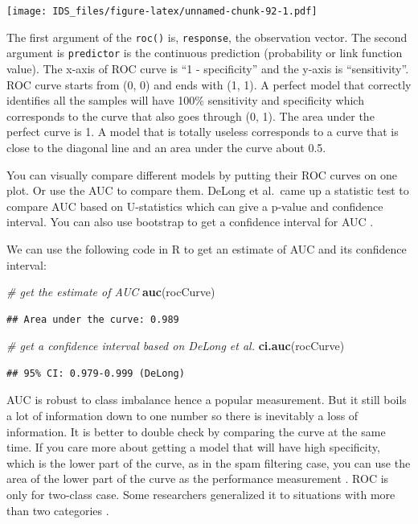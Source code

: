 \documentclass[12pt,]{krantz}
\makeatletter
\newenvironment{Shaded}{\begin{snugshade}}{\end{snugshade}}
\newcommand{\CommentTok}[1]{\textcolor[rgb]{0.37,0.37,0.37}{\textit{#1}}}
\newcommand{\KeywordTok}[1]{\textcolor[rgb]{0.27,0.27,0.27}{\textbf{#1}}}
\newcommand{\NormalTok}[1]{#1}
\newenvironment{kframe}{%
\medskip{}
\setlength{\fboxsep}{.8em}
 \def\at@end@of@kframe{}%
 \ifinner\ifhmode%
  \def\at@end@of@kframe{\end{minipage}}%
  \begin{minipage}{\columnwidth}%
 \fi\fi%
 \def\FrameCommand##1{\hskip\@totalleftmargin \hskip-\fboxsep
 \colorbox{shadecolor}{##1}\hskip-\fboxsep
     \hskip-\linewidth \hskip-\@totalleftmargin \hskip\columnwidth}%
 \MakeFramed {\advance\hsize-\width
   \@totalleftmargin\z@ \linewidth\hsize
   \@setminipage}}%
 {\par\unskip\endMakeFramed%
 \at@end@of@kframe}
\renewenvironment{Shaded}{\begin{kframe}}{\end{kframe}}
\makeatother
\begin{document}
\texttt{[image: IDS\_files/figure-latex/unnamed-chunk-92-1.pdf]}

The first argument of the \texttt{roc()} is, \texttt{response}, the observation vector. The second argument is \texttt{predictor} is the continuous prediction (probability or link function value). The x-axis of ROC curve is ``1 - specificity'' and the y-axis is ``sensitivity''. ROC curve starts from (0, 0) and ends with (1, 1). A perfect model that correctly identifies all the samples will have 100\% sensitivity and specificity which corresponds to the curve that also goes through (0, 1). The area under the perfect curve is 1. A model that is totally useless corresponds to a curve that is close to the diagonal line and an area under the curve about 0.5.

You can visually compare different models by putting their ROC curves on one plot. Or use the AUC to compare them. DeLong et al.~came up a statistic test to compare AUC based on U-statistics \citep{delong1988} which can give a p-value and confidence interval. You can also use bootstrap to get a confidence interval for AUC \citep{hall2004}.

We can use the following code in R to get an estimate of AUC and its confidence interval:

\begin{Shaded}
\begin{Highlighting}[]
\CommentTok{# get the estimate of AUC}
\KeywordTok{auc}\NormalTok{(rocCurve)}
\end{Highlighting}
\end{Shaded}

\begin{verbatim}
## Area under the curve: 0.989
\end{verbatim}

\begin{Shaded}
\begin{Highlighting}[]
\CommentTok{# get a confidence interval based on DeLong et al.}
\KeywordTok{ci.auc}\NormalTok{(rocCurve)}
\end{Highlighting}
\end{Shaded}

\begin{verbatim}
## 95% CI: 0.979-0.999 (DeLong)
\end{verbatim}

AUC is robust to class imbalance\citep{Provost1998, Fawcett2006} hence a popular measurement. But it still boils a lot of information down to one number so there is inevitably a loss of information. It is better to double check by comparing the curve at the same time. If you care more about getting a model that will have high specificity, which is the lower part of the curve, as in the spam filtering case, you can use the area of the lower part of the curve as the performance measurement \citep{McClish1989}. ROC is only for two-class case. Some researchers generalized it to situations with more than two categories \citep{Hand2001, Lachiche2003, Li2008}.
\end{document}
